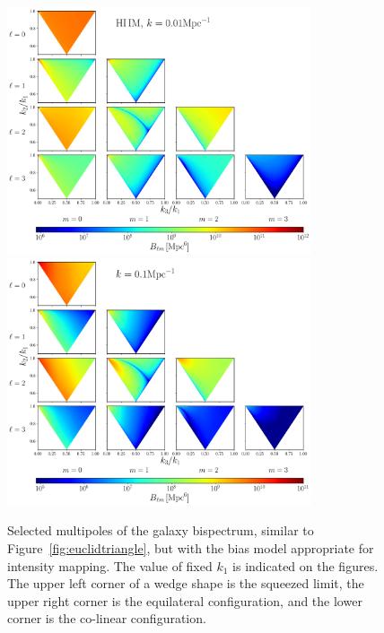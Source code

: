 {\clearpage
\begin{figure}[ht]
	\centering
	\includegraphics[width=0.8\textwidth]{fig/triangles_all_k001_IM.png}
	\includegraphics[width=0.8\textwidth]{fig/triangles_all_k01_IM.png} 
	\caption{Selected multipoles of the galaxy bispectrum, similar to Figure~\ref{fig:euclidtriangle}, but with the bias model appropriate for intensity mapping. The value of fixed \(k_1\) is indicated on the figures. The upper left corner of a wedge shape is the squeezed limit, the upper right corner is the equilateral configuration, and the lower corner is the co-linear configuration. \label{fig:imtriangle}}
\end{figure}

}

